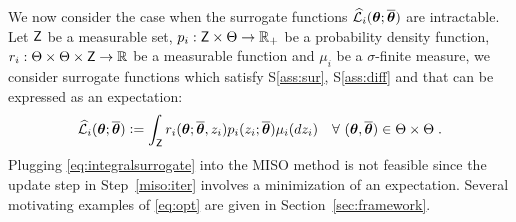 \documentclass[11pt]{article}
\theoremstyle{t}
\begin{document}
We now consider the case when the surrogate functions $\sur{i}{\param}{\op}$ are intractable. 
Let $\Zset$ be a measurable set, $p_i : \Zset \times \Param \rightarrow \rset_+$ be a probability density function, $r_i : \Param \times \Param \times \Zset \rightarrow \rset$ be a measurable function and $\mu_i$ be a $\sigma$-finite measure, we consider surrogate functions which satisfy S\ref{ass:sur}, S\ref{ass:diff} and that can be expressed as an expectation:
\begin{equation}\label{eq:integralsurrogate}
\sur{i}{\param}{\op} \eqdef \int_{\Zset}{\rsur{i}{\param}{\op}{z_i}  p_i(z_i ; \op)\mu_i(dz_i)}\quad \forall~(\param,\op) \in \Param \times \Param \eqsp.
\end{equation}
Plugging \eqref{eq:integralsurrogate} into the MISO method is not feasible since the update step in Step~\ref{miso:iter} involves a minimization of an expectation.
Several motivating examples of \eqref{eq:opt} are given in Section~\ref{sec:framework}.
\end{document}
